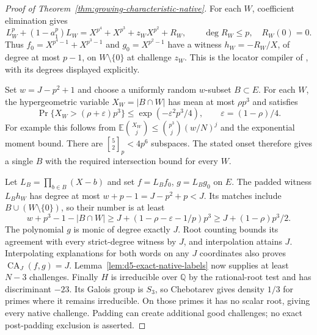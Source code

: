 \begin{proof}[Proof of Theorem~\ref{thm:growing-characteristic-native}]
For each $W$, coefficient elimination gives
\[
 L_W^p+(1-a_1^p)L_W
 =X^{p^4}+X^{p^3}+z_WX^{p^2}+R_W,
 \qquad \deg R_W\le p,\quad R_W(0)=0.
\]
Thus $f_0=X^{p^4-1}+X^{p^3-1}$ and $g_0=X^{p^2-1}$ have a witness $h_W=-R_W/X$, of degree at most $p-1$, on $W\setminus\{0\}$ at challenge $z_W$. This is the locator compiler of \cite{binary-counterexamples}, with its degrees displayed explicitly.

Set $w=J-p^2+1$ and choose a uniformly random $w$-subset $B\subset E$. For each $W$, the hypergeometric variable $X_W=|B\cap W|$ has mean at most $\rho p^3$ and satisfies
\[
 \Pr\{X_W>(\rho+\varepsilon)p^3\}
 \le \exp(-\varepsilon^2p^3/4),\qquad
 \varepsilon=(1-\rho)/4.
\]
For example this follows from
$\mathbb E\binom{X_W}{j}\le\binom{p^3}{j}(w/N)^j$
and the exponential moment bound. There are
$\genfrac{[}{]}{0pt}{}{5}{2}_p<4p^6$ subspaces. The stated onset therefore gives a single $B$ with the required intersection bound for every $W$.

Let $L_B=\prod_{b\in B}(X-b)$ and set $f=L_Bf_0$, $g=L_Bg_0$ on $E$. The padded witness $L_Bh_W$ has degree at most
$w+p-1=J-p^2+p<J$. Its matches include $B\cup(W\setminus\{0\})$, so their number is at least
\[
 w+p^3-1-|B\cap W|
 \ge J+(1-\rho-\varepsilon-1/p)p^3
 \ge J+(1-\rho)p^3/2.
\]
The polynomial $g$ is monic of degree exactly $J$. Root counting bounds its agreement with every strict-degree witness by $J$, and interpolation attains $J$. Interpolating explanations for both words on any $J$ coordinates also proves $\operatorname{CA}_J(f,g)=J$.
Lemma~\ref{lem:d5-exact-native-labels} now supplies at least $N-3$ challenges. Finally $H$ is irreducible over $\mathbb Q$ by the rational-root test and has discriminant $-23$. Its Galois group is $S_3$, so Chebotarev gives density $1/3$ for primes where it remains irreducible. On those primes it has no scalar root, giving every native challenge. Padding can create additional good challenges; no exact post-padding exclusion is asserted.
\end{proof}
